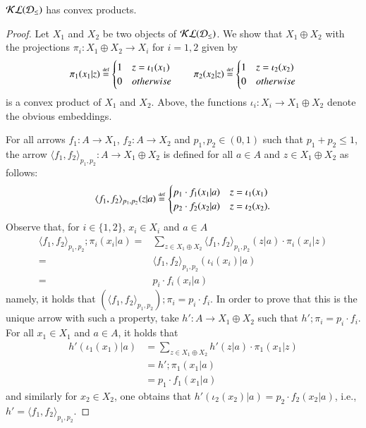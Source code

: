 \begin{proposition}
$\mathcal{KL}(\mathcal{D}_{\leq})$ has convex products.
\end{proposition}
\begin{proof}
Let $X_1$ and $X_2$ be two objects of $\mathcal{KL}(\mathcal{D}_{\leq})$.
We show that  $X_1\oplus X_2$ with the projections $\pi_i\colon X_1 \oplus X_2 \to X_i$ for $i=1,2$ given by 
\[ \pi_1(x_1|z)\stackrel{\text{\tiny def}}{=} \begin{cases}
    1 & z=\iota_1(x_1)\\
    0 & otherwise
\end{cases} \qquad \pi_2(x_2|z)\stackrel{\text{\tiny def}}{=} \begin{cases}
     1 & z=\iota_2(x_2)\\
        0 & otherwise
\end{cases}\]
 is a convex product of $X_1$ and $X_2$. Above, the functions $\iota_i\colon X_i \to X_1 \oplus X_2$ denote the obvious embeddings.
 
For all arrows $f_1\colon A\to X_1$, $f_2\colon A\to X_2$ and $p_1,p_2 \in (0,1)$ such that $p_1+p_2\le 1$, the arrow $\langle f_1,f_2\rangle_{p_1,p_2}\colon A \to X_1\oplus X_2$ is defined for all $a\in A$ and $z\in X_1\oplus X_2$ as follows:
\[ \langle f_1,f_2\rangle_{p_1,p_2}(z|a) \stackrel{\text{\tiny def}}{=} \begin{cases}
    p_1\cdot f_1(x_1|a) & z=\iota_1(x_1)\\
    p_2\cdot f_2(x_2|a) & z=\iota_2(x_2) \text{.}
\end{cases}\]
Observe that, for $i\in \{1,2\}$, $x_i\in X_i$ and $a\in A$
\begin{align*}
\langle f_1,f_2\rangle_{p_1,p_2} ; \pi_i (x_i | a) = & \sum_{z\in X_1\oplus X_2} \langle f_1,f_2\rangle_{p_1,p_2}(z|a) \cdot \pi_i (x_i | z) \\
= & \langle f_1,f_2\rangle_{p_1,p_2} (\iota_i(x_i)|a)\\
= & p_i\cdot f_i (x_i|a)
\end{align*}
namely, it holds that $(\langle f_1,f_2\rangle_{p_1,p_2} );\pi_i = p_i\cdot f_i$. In order to prove that this is the unique arrow with such a property, take $h'\colon A \to X_1\oplus X_2$ such that $h';\pi_i = p_i\cdot f_i$. For all $x_1\in X_1$ and $a\in A$, it holds that
\begin{align*}
  h'(\iota_1(x_1)|a) 
    & =\sum_{z\in X_1\oplus X_2} h'(z|a) \cdot \pi_1(x_1|z) \tag*{}\\
   &= h' ; \pi_1(x_1|a) \\
    &= p_1\cdot f_1(x_1|a) \tag*{}
\end{align*}
and similarly for $x_2\in X_2$, one obtains that $h'(\iota_2(x_2)|a) = p_2\cdot f_2(x_2|a)$, i.e., $h' = \langle f_1,f_2\rangle_{p_1,p_2}$. 
\end{proof}


